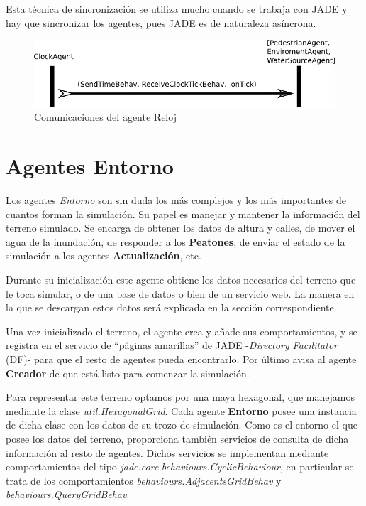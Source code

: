 Esta técnica de sincronización se utiliza mucho cuando se trabaja con JADE y
hay que sincronizar los agentes, pues JADE es de naturaleza asíncrona.

\begin{figure}[H]
 \centering
 \includegraphics[width=120mm]{figuras/cap5/com_clock.png}
 \caption{Comunicaciones del agente Reloj}
\end{figure}

\section{Agentes Entorno}

Los agentes {\em Entorno} son sin duda los más complejos y los más importantes
de cuantos forman la simulación. Su papel es manejar y mantener la información
del terreno simulado. Se encarga de obtener los datos de altura y calles, de
mover el agua de la inundación, de responder a los {\bf Peatones}, de enviar el
estado de la simulación a los agentes {\bf Actualización}, etc.

Durante su inicialización este agente obtiene los datos necesarios del terreno
que le toca simular, o de una base de datos o bien de un servicio web. La manera
en la que se descargan estos datos será explicada en la sección correspondiente.

Una vez inicializado el terreno, el agente crea y añade sus comportamientos, y
se registra en el servicio de ``páginas amarillas'' de JADE -{\em Directory
Facilitator} (DF)- para que el resto de agentes pueda encontrarlo. Por último
avisa al agente {\bf Creador} de que está listo para comenzar la simulación.

Para representar este terreno optamos por una maya hexagonal, que manejamos
mediante la clase {\em util.HexagonalGrid}. Cada agente {\bf Entorno} posee una
instancia de dicha clase con los datos de su trozo de simulación. Como es el
entorno el que posee los datos del terreno, proporciona también servicios de
consulta de dicha información al resto de agentes. Dichos servicios se
implementan mediante comportamientos del tipo {\em
jade.core.behaviours.CyclicBehaviour}, en particular se trata de los
comportamientos {\em behaviours.AdjacentsGridBehav} y {\em
behaviours.QueryGridBehav}.

